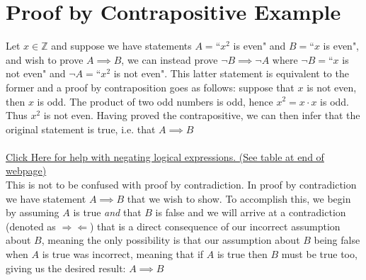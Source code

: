 \section{Proof by Contrapositive Example} 
\label{sec:ContrapositiveExample}
Let $x\in \mathbb{Z}$ and suppose we have statements $A=$``$x^2$ is even" and $B=$``$x$ is even", and wish to prove $A\implies B$, we can instead prove $\lnot B \implies \lnot A$ where $\lnot B=$``$x$ is not even" and $\lnot A=$``$x^2$ is not even". This latter statement is equivalent to the former and a proof by contraposition goes as follows: suppose that $x$ is not even, then $x$ is odd. The product of two odd numbers is odd, hence $x^2 = x\cdot x$ is odd. Thus $x^2$ is not even. Having proved the contrapositive, we can then infer that the original statement is true, i.e. that $A \implies B$ \\ \\
\href{https://www.math.toronto.edu/preparing-for-calculus/3_logic/we_3_negation.html}{Click Here for help with negating logical expressions. (See table at end of webpage)}\\

\noindent This is not to be confused with proof by contradiction. In proof by contradiction we have statement $A\implies B$ that we wish to show. To accomplish this, we begin by assuming $A$ is true \textit{and} that $B$ is false and we will arrive at a contradiction (denoted as $\Rightarrow\Leftarrow$) that is a direct consequence of our incorrect assumption about $B$, meaning the only possibility is that our assumption about $B$ being false when $A$ is true was incorrect, meaning that if $A$ is true then $B$ must be true too, giving us the desired result: $A \implies B$ 

